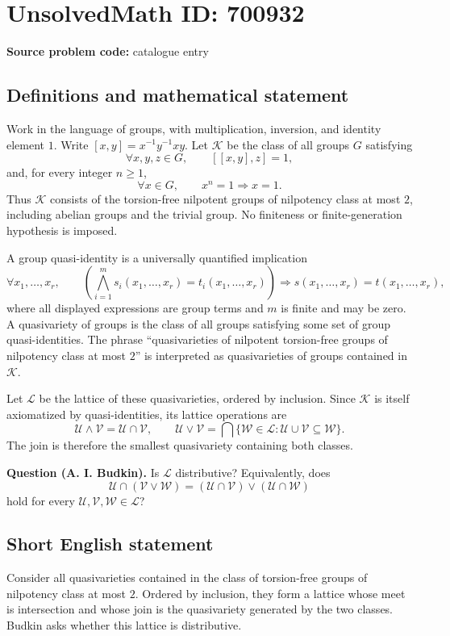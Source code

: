 \documentclass[11pt]{article}
\begin{document}
\section*{UnsolvedMath ID: 700932}
\textbf{Source problem code:} catalogue entry
\subsection{Definitions and mathematical statement}
Work in the language of groups, with multiplication, inversion, and identity element \(1\). Write \([x,y]=x^{-1}y^{-1}xy\). Let \(\mathcal K\) be the class of all groups \(G\) satisfying
\[
\forall x,y,z\in G,\qquad [[x,y],z]=1,
\]
and, for every integer \(n\geq 1\),
\[
\forall x\in G,\qquad x^n=1\Longrightarrow x=1.
\]
Thus \(\mathcal K\) consists of the torsion-free nilpotent groups of nilpotency class at most \(2\), including abelian groups and the trivial group. No finiteness or finite-generation hypothesis is imposed.

A group quasi-identity is a universally quantified implication
\[
\forall x_1,\ldots,x_r,\qquad
\left(\bigwedge_{i=1}^{m}s_i(x_1,\ldots,x_r)=t_i(x_1,\ldots,x_r)\right)
\Longrightarrow s(x_1,\ldots,x_r)=t(x_1,\ldots,x_r),
\]
where all displayed expressions are group terms and \(m\) is finite and may be zero. A quasivariety of groups is the class of all groups satisfying some set of group quasi-identities. The phrase ``quasivarieties of nilpotent torsion-free groups of nilpotency class at most \(2\)'' is interpreted as quasivarieties of groups contained in \(\mathcal K\).

Let \(\mathcal L\) be the lattice of these quasivarieties, ordered by inclusion. Since \(\mathcal K\) is itself axiomatized by quasi-identities, its lattice operations are
\[
\mathcal U\wedge\mathcal V=\mathcal U\cap\mathcal V,
\qquad
\mathcal U\vee\mathcal V=
\bigcap\{\mathcal W\in\mathcal L:\mathcal U\cup\mathcal V\subseteq\mathcal W\}.
\]
The join is therefore the smallest quasivariety containing both classes.

\textbf{Question (A. I. Budkin).} Is \(\mathcal L\) distributive? Equivalently, does
\[
\mathcal U\cap(\mathcal V\vee\mathcal W)
=(\mathcal U\cap\mathcal V)\vee(\mathcal U\cap\mathcal W)
\]
hold for every \(\mathcal U,\mathcal V,\mathcal W\in\mathcal L\)?
\subsection{Short English statement}
Consider all quasivarieties contained in the class of torsion-free groups of nilpotency class at most \(2\). Ordered by inclusion, they form a lattice whose meet is intersection and whose join is the quasivariety generated by the two classes. Budkin asks whether this lattice is distributive.
\end{document}
